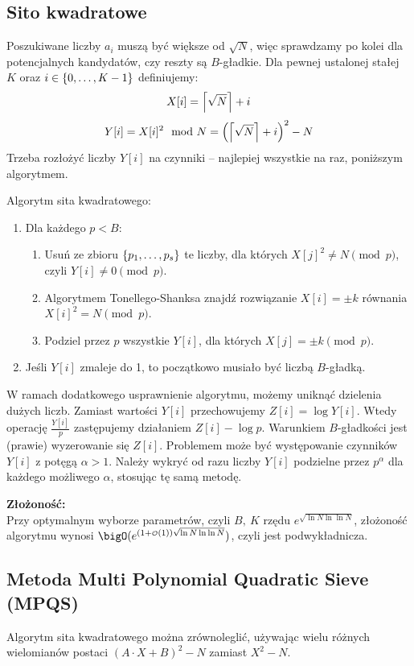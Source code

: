 \subsection{Sito kwadratowe}
Poszukiwane liczby \( a_i \) muszą być większe od \( \sqrt{N} \), więc sprawdzamy po kolei dla potencjalnych kandydatów, czy reszty są \( B \)-gładkie.
Dla pewnej ustalonej stałej \( K \) oraz \( i \in \set{0, \dots, K-1} \) definiujemy:
\[ X[i] = \left\lceil\sqrt{N}\right\rceil + i \]
\[ Y[i] = X[i]^2 \mod N = \left(\left\lceil\sqrt{N}\right\rceil + i\right)^2 - N \]
Trzeba rozłożyć liczby \( Y[i] \) na czynniki -- najlepiej wszystkie na raz, poniższym algorytmem.
\begin{greyframe}
    Algorytm sita kwadratowego:
    \begin{enumerate}
        \item Dla każdego \( p < B \):
        \begin{enumerate}
            \item Usuń ze zbioru \( \set{p_1, \dots, p_s} \) te liczby, dla których \( X[j]^2 \neq N \pmod{p} \), \\ czyli \( Y[i] \neq 0 \pmod{p} \).
            \item Algorytmem Tonellego-Shanksa znajdź rozwiązanie \( X[i] = \pm k \) równania \\ \( X[i]^2 = N \pmod{p} \).
            \item Podziel przez \( p \) wszystkie \( Y[i] \), dla których \( X[j] = \pm k \pmod{p} \).
        \end{enumerate}
        \item Jeśli \( Y[i] \) zmaleje do 1, to początkowo musiało być liczbą \( B \)-gładką.
    \end{enumerate}
\end{greyframe}
W ramach dodatkowego usprawnienie algorytmu, możemy uniknąć dzielenia dużych liczb. Zamiast wartości \( Y[i] \) przechowujemy \( Z[i] = \log Y[i] \).
Wtedy operację \( \frac{Y[i]}{p} \) zastępujemy działaniem \( Z[i] - \log p \). Warunkiem \( B \)-gładkości jest (prawie) wyzerowanie się \( Z[i] \).
Problemem może być występowanie czynników \( Y[i] \) z potęgą \( \alpha > 1 \). Należy wykryć od razu liczby \( Y[i] \) podzielne przez \( p^{\alpha} \) dla każdego możliwego \( \alpha \), stosując tę samą metodę.

\textbf{Złożoność:} \\
Przy optymalnym wyborze parametrów, czyli \( B, \ K \) rzędu \( e^{\sqrt{\ln N \ln\ln N}} \), złożoność algorytmu wynosi \( \bigO(e^{(1 + {\scriptscriptstyle\mathcal{O}}(1))\sqrt{\ln N \ln\ln N}}) \), czyli jest podwykładnicza.

\subsection{Metoda Multi Polynomial Quadratic Sieve (MPQS)}
Algorytm sita kwadratowego można zrównoleglić, używając wielu różnych wielomianów postaci \( (A \cdot X + B)^2 - N \) zamiast \( X^2 - N \).
